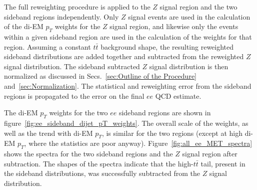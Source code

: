 \documentclass[dissertation.tex]{subfiles}
\begin{document}
The full reweighting procedure is applied to the $Z$ signal region and the two sideband regions independently.  Only $Z$ signal events are used in the calculation of the di-EM $p_{T}$ weights for the $Z$ signal region, and likewise only the events within a given sideband region are used in the calculation of the weights for that region.  Assuming a constant $t\bar{t}$ background shape, the resulting reweighted sideband \MET distributions are added together and subtracted from the reweighted $Z$ signal \MET distribution.  The sideband subtracted $Z$ signal \MET distribution is then normalized as discussed in Secs.~\ref{sec:Outline of the Procedure} and~\ref{sec:Normalization}.  The statistical and reweighting error from the sideband regions is propagated to the error on the final $ee$ QCD \MET estimate.

The di-EM $p_{T}$ weights for the two $ee$ sideband regions are shown in figure~\ref{fig:ee_sideband_dijet_pT_weights}.  The overall scale of the weights, as well as the trend with di-EM $p_{T}$, is similar for the two regions (except at high di-EM $p_{T}$, where the statistics are poor anyway).  Figure~\ref{fig:all_ee_MET_spectra} shows the \MET spectra for the two sideband regions and the $Z$ signal region after subtraction.  The shapes of the spectra indicate that the high-\MET $t\bar{t}$ tail, present in the sideband distributions, was successfully subtracted from the $Z$ signal distribution.
\end{document}

